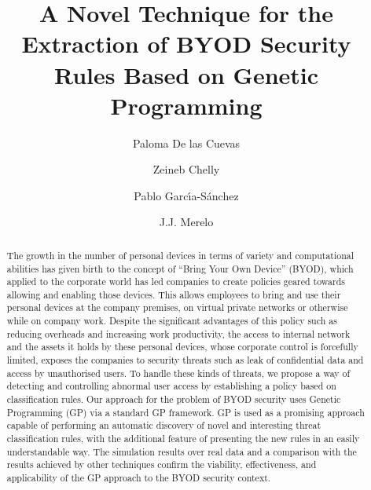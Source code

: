 \documentclass[a4paper,10pt,twocolumn,preprint,3p]{elsarticle}
\begin{document}
\begin{frontmatter}

\title{A Novel Technique for the Extraction of BYOD Security Rules Based on Genetic Programming}

\author[ugr]{Paloma De las Cuevas}
\author[isgt]{Zeineb Chelly}
\author[ugr]{Pablo Garc\'{\i}a-S\'anchez}
\author[ugr]{J.J. Merelo}

\address[ugr]{Department of Computer Architecture and Computer Technology, ETSIIT and CITIC \\
University of Granada, Granada, Spain. Tel: +34958241778. Fax: +34958248993}
\address[isgt]{LARODEC, Institut Sup\'erieur de Gestion de Tunis, Tunisia.}


\begin{abstract}
The growth in the number of personal devices in terms of variety and
computational %
abilities has given birth to the concept of ``Bring Your Own Device''
(BYOD), which applied to the corporate world has led companies to
create policies geared towards allowing and enabling those devices. %
This allows %
employees to bring and use their personal devices at
the company premises, on virtual private networks or otherwise while
on company work. Despite the significant advantages of this policy
such as reducing overheads and increasing work productivity, 
the
access to internal network and the assets it holds by these personal
devices, whose corporate control is forcefully limited, exposes the companies to
security threats such as leak of confidential data and access by
unauthorised users. %
To handle these kinds of threats, we propose a way of detecting and controlling abnormal user
access by establishing a policy based on classification rules. Our
approach for the problem of BYOD security uses Genetic Programming
(GP) via a standard GP framework. GP is used as a promising approach %
capable of performing an automatic discovery of novel and interesting
threat classification rules, with the additional feature of presenting
the new rules in an easily understandable way. %
The simulation results over real data and a
comparison with the results achieved by other techniques confirm the
viability, effectiveness, and applicability of the GP approach to the
BYOD security context.
\end{abstract}



\end{frontmatter}
\end{document}
